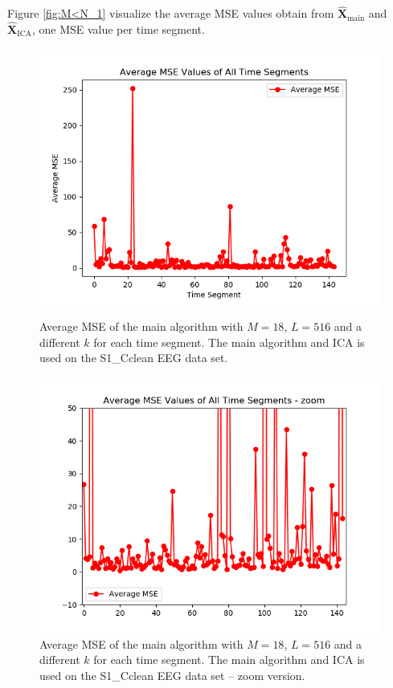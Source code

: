 Figure \ref{fig:M<N_1} visualize the average MSE values obtain from $\hat{\mathbf{X}}_{\text{main}}$ and $\hat{\mathbf{X}}_{\text{ICA}}$, one MSE value per time segment.
\begin{figure}[H]
    \begin{minipage}[t]{.45\textwidth}
		\centering
		\includegraphics[scale=0.5]{figures/ch_7/AveMSE_3M_N.png}
	\caption{Average MSE of the main algorithm with $M=18$, $L = 516$ and a different $k$ for each time segment. The main algorithm and ICA is used on the S1\_Cclean EEG data set.}
	\label{fig:M<N_1}
    \end{minipage} 
    \hfill
    \begin{minipage}[t]{.45\textwidth}
        \centering
		\includegraphics[scale=0.5]{figures/ch_7/AveMSE_3M_N_zoom.png}
	\caption{Average MSE of the main algorithm with $M=18$, $L = 516$ and a different $k$ for each time segment. The main algorithm and ICA is used on the S1\_Cclean EEG data set -- zoom version.}
	\label{fig:M<N_1_2}
    \end{minipage}
\end{figure}
\noindent 
 
